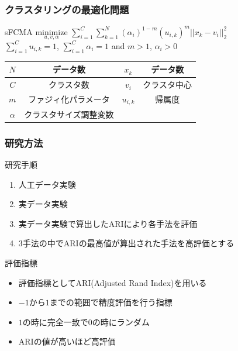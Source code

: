 \documentclass[13pt,dvipdfmx]{beamer}
\begin{document}
\begin{frame}\frametitle{クラスタリングの最適化問題}
  \begin{block}{sFCMA}
    \quad$\underset{u,v,\alpha}{\text{minimize}}$
    $\sum_{i=1}^C\sum_{k=1}^N(\alpha_{i})^{1-m}(u_{i,k})^m||x_k-v_i||_2^2$\\
    \qquad\qquad{}$\sum_{i=1}^Cu_{i,k}=1$\;, \;$\sum_{i=1}^C\alpha_{i}=1$\; and \;$m>1$\;, \;$\alpha_{i}>0$
  \end{block}
  \begin{center}
    \begin{tabular}{c|c||c|c} \hline
	  {$N$}&データ数&{$x_k$}&データ数 \\ \hline
	  {$C$}&クラスタ数&{$v_i$}&クラスタ中心\\ \hline
	  {$m$}&ファジィ化パラメータ&{$u_{i,k}$}&帰属度 \\ \hline
	  {$\alpha$}&クラスタサイズ調整変数\\ \hline
    \end{tabular}
  \end{center}
\end{frame}

\begin{frame}\frametitle{研究方法}
 \begin{block}{研究手順}
   \begin{enumerate}
    \item 人工データ実験
    \item 実データ実験
    \item 実データ実験で算出したARIにより各手法を評価
    \item 3手法の中でARIの最高値が算出された手法を高評価とする
   \end{enumerate}
 \end{block}
 \begin{block}{評価指標}
  \begin{itemize}
   \item 評価指標としてARI(Adjusted Rand Index)を用いる
   \item $-1$から$1$までの範囲で精度評価を行う指標
   \item $1$の時に完全一致で$0$の時にランダム
   \item ARIの値が高いほど高評価
  \end{itemize}
 \end{block}
\end{frame}
\end{document}

